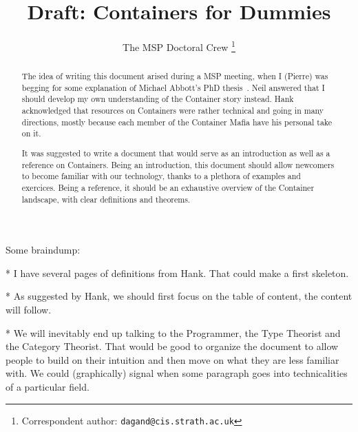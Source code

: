 \documentclass{article}
\begin{document}

\title{Draft: Containers for Dummies}
\author{The MSP Doctoral Crew
        \footnote{Correspondent author: 
                  \texttt{dagand@cis.strath.ac.uk}}}

\maketitle



\begin{abstract}
The idea of writing this document arised during a MSP meeting, when I
(Pierre) was begging for some explanation of Michael Abbott's PhD
thesis~\cite{abbott:phd-thesis}. Neil answered that I should develop
my own understanding of the Container story instead. Hank acknowledged
that resources on Containers were rather technical and going in many
directions, mostly because each member of the Container Mafia have his
personal take on it.

It was suggested to write a document that would serve as an
introduction as well as a reference on Containers. Being an
introduction, this document should allow newcomers to become familiar
with our technology, thanks to a plethora of examples and
exercices. Being a reference, it should be an exhaustive overview of
the Container landscape, with clear definitions and theorems.
\end{abstract}


\begin{structure}
Some braindump:

* I have several pages of definitions from Hank. That could make a
  first skeleton.

* As suggested by Hank, we should first focus on the table of content,
  the content will follow.

* We will inevitably end up talking to the Programmer, the Type
Theorist and the Category Theorist. That would be good to organize the
document to allow people to build on their intuition and then move on
what they are less familiar with. We could (graphically) signal when
some paragraph goes into technicalities of a particular field.
\end{structure}






\end{document}
